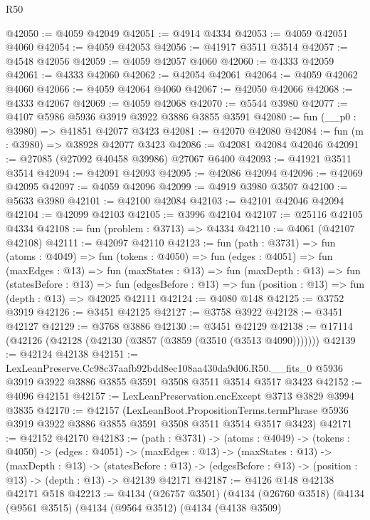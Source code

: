 \begin{lexlean}{R50}
\begin{coremodule}
@42050 := @4059 @42049
@42051 := @4914 @4334
@42053 := @4059 @42051 @4060
@42054 := @4059 @42053
@42056 := @41917 @3511 @3514
@42057 := @4548 @42056
@42059 := @4059 @42057 @4060
@42060 := @4333 @42059
@42061 := @4333 @42060
@42062 := @42054 @42061
@42064 := @4059 @42062 @4060
@42066 := @4059 @42064 @4060
@42067 := @42050 @42066
@42068 := @4333 @42067
@42069 := @4059 @42068
@42070 := @5544 @3980
@42077 := @4107 @5986 @5936 @3919 @3922 @3886 @3855 @3591
@42080 := fun (__p0 : @3980) => @41851 @42077 @3423
@42081 := @42070 @42080
@42084 := fun (m : @3980) => @38928 @42077 @3423
@42086 := @42081 @42084 @42046
@42091 := @27085 (@27092 @40458 @39986) @27067 @6400
@42093 := @41921 @3511 @3514
@42094 := @42091 @42093
@42095 := @42086 @42094
@42096 := @42069 @42095
@42097 := @4059 @42096
@42099 := @4919 @3980 @3507
@42100 := @5633 @3980
@42101 := @42100 @42084
@42103 := @42101 @42046 @42094
@42104 := @42099 @42103
@42105 := @3996 @42104
@42107 := @25116 @42105 @4334
@42108 := fun (problem : @3713) => @4334
@42110 := @4061 (@42107 @42108)
@42111 := @42097 @42110
@42123 := fun (path : @3731) =>
  fun (atoms : @4049) =>
  fun (tokens : @4050) =>
  fun (edges : @4051) =>
  fun (maxEdges : @13) =>
  fun (maxStates : @13) =>
  fun (maxDepth : @13) =>
  fun (statesBefore : @13) =>
  fun (edgesBefore : @13) => fun (position : @13) => fun (depth : @13) => @42025 @42111
@42124 := @4080 @148
@42125 := @3752 @3919
@42126 := @3451 @42125
@42127 := @3758 @3922
@42128 := @3451 @42127
@42129 := @3768 @3886
@42130 := @3451 @42129
@42138 := @17114 (@42126 (@42128 (@42130 (@3857 (@3859 (@3510 (@3513 @4090)))))))
@42139 := @42124 @42138
@42151 := LexLeanPreserve.Cc98c37aafb92bdd8ec108aa430da9d06.R50.__fits_0
    @5936
    @3919
    @3922
    @3886
    @3855
    @3591
    @3508
    @3511
    @3514
    @3517
    @3423
@42152 := @4096 @42151
@42157 := LexLeanPreservation.encExcept @3713 @3829 @3994 @3835
@42170 := @42157
    (LexLeanBoot.PropositionTerms.termPhrase
      @5936
      @3919
      @3922
      @3886
      @3855
      @3591
      @3508
      @3511
      @3514
      @3517
      @3423)
@42171 := @42152 @42170
@42183 := (path : @3731) ->
  (atoms : @4049) ->
  (tokens : @4050) ->
  (edges : @4051) ->
  (maxEdges : @13) ->
  (maxStates : @13) ->
  (maxDepth : @13) ->
  (statesBefore : @13) -> (edgesBefore : @13) -> (position : @13) -> (depth : @13) -> @42139 @42171
@42187 := @4126 @148 @42138 @42171 @518
@42213 := @4134
    (@26757 @3501)
    (@4134
      (@26760 @3518)
      (@4134
        (@9561 @3515)
        (@4134
          (@9564 @3512)
          (@4134
            (@4138 @3509)

\end{coremodule}
\end{lexlean}
